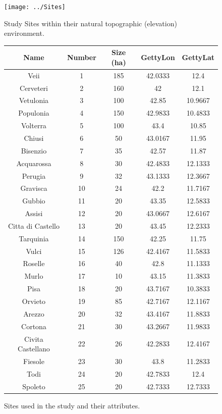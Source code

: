 \documentclass[12pt,a4paper]{thesis}
\begin{document}
\begin{figure}
\centering
\texttt{[image: ../Sites]}
\caption{Study Sites within their natural topographic (elevation) environment.}
\label{fig:Sites}
\end{figure}


\begin{figure}
\centering
\begin{tabular}{|c|c|c|c|c|}
\hline \textbf{Name} & \textbf{Number} & \textbf{Size (ha)} & \textbf{GettyLon} & \textbf{GettyLat} \\ 
\hline 	Veii	&	1	&	185	&	42.0333	&	12.4	\\
\hline 	Cerveteri	&	2	&	160	&	42	&	12.1	\\
\hline 	Vetulonia	&	3	&	100	&	42.85	&	10.9667	\\
\hline 	Populonia	&	4	&	150	&	42.9833	&	10.4833	\\
\hline 	Volterra	&	5	&	100	&	43.4	&	10.85	\\
\hline 	Chiusi	&	6	&	50	&	43.0167	&	11.95	\\
\hline 	Bisenzio	&	7	&	35	&	42.57	&	11.87	\\
\hline 	Acquarossa	&	8	&	30	&	42.4833	&	12.1333	\\
\hline 	Perugia	&	9	&	32	&	43.1333	&	12.3667	\\
\hline 	Gravisca	&	10	&	24	&	42.2	&	11.7167	\\
\hline 	Gubbio	&	11	&	20	&	43.35	&	12.5833	\\
\hline 	Assisi	&	12	&	20	&	43.0667	&	12.6167	\\
\hline 	Citta di Castello	&	13	&	20	&	43.45	&	12.2333	\\
\hline 	Tarquinia	&	14	&	150	&	42.25	&	11.75	\\
\hline 	Vulci	&	15	&	126	&	42.4167	&	11.5833	\\
\hline 	Roselle	&	16	&	40	&	42.8	&	11.1333	\\
\hline 	Murlo	&	17	&	10	&	43.15	&	11.3833	\\
\hline 	Pisa	&	18	&	20	&	43.7167	&	10.3833	\\
\hline 	Orvieto	&	19	&	85	&	42.7167	&	12.1167	\\
\hline 	Arezzo	&	20	&	32	&	43.4167	&	11.8833	\\
\hline 	Cortona	&	21	&	30	&	43.2667	&	11.9833	\\
\hline 	Civita Castellano	&	22	&	26	&	42.2833	&	12.4167	\\
\hline 	Fiesole	&	23	&	30	&	43.8	&	11.2833	\\
\hline 	Todi	&	24	&	20	&	42.7833	&	12.4	\\
\hline 	Spoleto	&	25	&	20	&	42.7333	&	12.7333	\\
\hline
\end{tabular} 
\caption{ Sites used in the study and their attributes.}
\label{fig:SiteData}
\end{figure}
\end{document}
